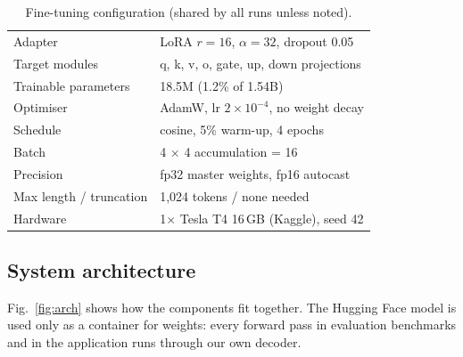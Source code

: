 \documentclass[conference]{IEEEtran}
\begin{document}
\begin{table}[t]
\centering
\caption{Fine-tuning configuration (shared by all runs unless noted).}
\label{tab:hparams}
\begin{tabular}{ll}
\toprule
Adapter & LoRA $r{=}16$, $\alpha{=}32$, dropout 0.05 \\
Target modules & q, k, v, o, gate, up, down projections \\
Trainable parameters & 18.5M (1.2\% of 1.54B) \\
Optimiser & AdamW, lr $2\times10^{-4}$, no weight decay \\
Schedule & cosine, 5\% warm-up, 4 epochs \\
Batch & 4 $\times$ 4 accumulation = 16 \\
Precision & fp32 master weights, fp16 autocast \\
Max length / truncation & 1{,}024 tokens / none needed \\
Hardware & 1$\times$ Tesla T4 16\,GB (Kaggle), seed 42 \\
\bottomrule
\end{tabular}
\end{table}

\subsection{System architecture}
Fig.~\ref{fig:arch} shows how the components fit together. The Hugging Face model is used only as a container for weights: every forward pass in evaluation benchmarks and in the application runs through our own decoder.
\end{document}
